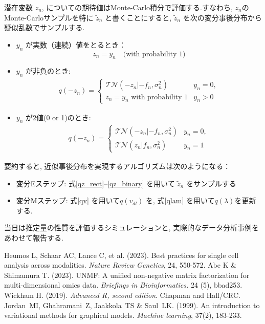 \documentclass[a4paper,12ptc]{jsarticle} %
\begin{document}
潜在変数 $z_n$, についての期待値はMonte-Carlo積分で評価する.すなわち, $z_n$のMonte-Carloサンプルを特に $\tilde z_n$ と書くことにすると, $\tilde z_n$ を次の変分事後分布から疑似乱数でサンプルする. 
\begin{itemize}
\item $y_n$ が実数（連続）値をとるとき： 
$$
z_n=y_n \quad \mbox{(with probability 1)}
$$
\item $y_n$ が非負のとき:
\begin{align}
q(-z_n) = \begin{cases}
    \mathcal{TN}(-z_n|-f_n, \sigma_n^2) & y_n=0,\\
    z_n = y_n \mbox{~with probability 1} & y_n>0
\end{cases} \label{qz_rect}
\end{align}
\item $y_n$ が2値(0 or 1)のとき:
\begin{align}
q(-z_n) = \begin{cases}
    \mathcal{TN}(-z_n|-f_n, \sigma_n^2) & y_n=0,\\
    \mathcal{TN}(z_n|f_n, \sigma_n^2) & y_n=1
\end{cases}\label{qz_binary}
\end{align}
\end{itemize}

要約すると, 近似事後分布を実現するアルゴリズムは次のようになる：
\begin{itemize}
\item 変分Eステップ: 式\ref{qz_rect}--\ref{qz_binary} を用いて $\tilde{z}_n$ をサンプルする 
\item 変分Mステップ:  式\ref{qv} を用いて$q(v_{dl})$ を, 式\ref{qlam} を用いて$q(\lambda)$を更新する. 
\end{itemize}

当日は推定量の性質を評価するシミュレーションと, 実際的なデータ分析事例をあわせて報告する.

\begin{thebibliography}{9}
 Heumos L, Schaar AC, Lance C, et al. (2023). Best practices for single cell analysis across modalities. {\em Nature Review Genetics}, 24, 550-572.
 Abe K \& Shimamura T. (2023). UNMF: A unified non-negative matrix factorization for multi-dimensional omics data. {\em Briefings in Bioinformatics.}  24 (5), bbad253.
 Wickham H. (2019).  {\em Advanced R, second edition}. Chapman and Hall/CRC.
 Jordan~MI, Ghahramani~Z, Jaakkola~TS \& Saul~LK. (1999). An introduction to variational methods for graphical models. {\em Machine learning}, 37(2), 183-233.
\end{thebibliography}
\end{document}
